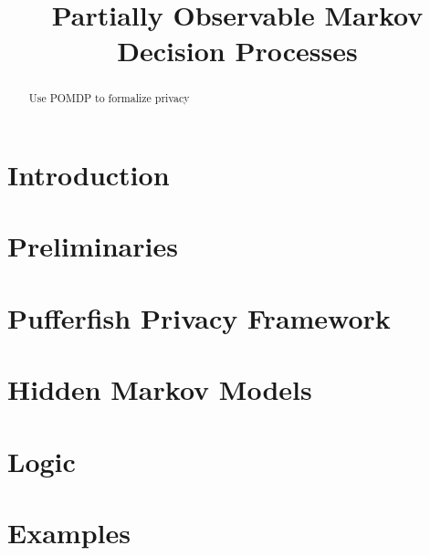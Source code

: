 \documentclass{llncs}
\title{Partially Observable Markov Decision Processes}
\begin{document}
\maketitle

\begin{abstract}
  Use POMDP to formalize privacy
\end{abstract}

\section{Introduction}
\label{section:introduction}

\section{Preliminaries}
\label{section:preliminaries}


\section{Pufferfish Privacy Framework}
\label{section:pufferfish}


\section{Hidden Markov Models}


\section{Logic}
\label{section:logic}


\section{Examples}
\label{section:examples}




\end{document}
